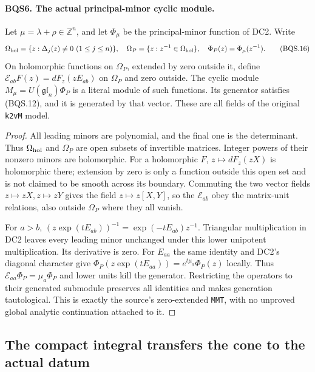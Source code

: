 \paragraph{BQS6. The actual principal-minor cyclic module.}
\label{claim:BQS6}
Let $\mu=\lambda+\rho\in\mathbb Z^n$, and let $\Phi_\mu$ be the
principal-minor function of DC2.  Write
\[
 \Omega_{\rm hol}=\{z:\Delta_j(z)\ne0\ (1\le j\le n)\},\quad
 \Omega_P=\{z:z^{-1}\in\Omega_{\rm hol}\},\quad
 \Phi_P(z)=\Phi_\mu(z^{-1}).
 \tag{BQS.16}
\]
On holomorphic functions on $\Omega_P$, extended by zero outside it,
define
$\mathcal E_{ab}F(z)=dF_z(zE_{ab})$ on $\Omega_P$ and zero outside.
The cyclic module $M_\mu=U(\mathfrak{gl}_n)\Phi_P$ is a literal module
of such functions.  Its generator satisfies (BQS.12), and it is
generated by that vector.  These are all fields of the original
\texttt{k2vM} model.

\begin{proof}
All leading minors are polynomial, and the final one is the determinant.
Thus $\Omega_{\rm hol}$ and $\Omega_P$ are open subsets of invertible
matrices.  Integer powers of their nonzero minors are holomorphic.
For a holomorphic $F$, $z\mapsto dF_z(zX)$ is holomorphic there;
extension by zero is only a function outside this open set and is not
claimed to be smooth across its boundary.
Commuting the two vector fields $z\mapsto zX,z\mapsto zY$ gives
the field $z\mapsto z[X,Y]$, so the $\mathcal E_{ab}$ obey the
matrix-unit relations, also outside $\Omega_P$ where they all vanish.

For $a>b$, $(z\exp(tE_{ab}))^{-1}=\exp(-tE_{ab})z^{-1}$.
Triangular multiplication in DC2 leaves every leading minor unchanged
under this lower unipotent multiplication.  Its derivative is zero.
For $E_{aa}$ the same identity and DC2's diagonal character give
$\Phi_P(z\exp(tE_{aa}))=e^{t\mu_a}\Phi_P(z)$ locally.
Thus $\mathcal E_{aa}\Phi_P=\mu_a\Phi_P$ and lower units kill the
generator.  Restricting the operators to their generated submodule
preserves all identities and makes generation tautological.
This is exactly the source's zero-extended \texttt{MMT}, with no
unproved global analytic continuation attached to it.
\end{proof}

\subsection{The compact integral transfers the cone to the actual datum}

